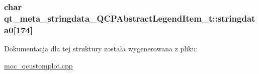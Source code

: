 \subsubsection[{\texorpdfstring{stringdata0}{stringdata0}}]{\setlength{\rightskip}{0pt plus 5cm}char qt\+\_\+meta\+\_\+stringdata\+\_\+\+Q\+C\+P\+Abstract\+Legend\+Item\+\_\+t\+::stringdata0\mbox{[}174\mbox{]}}\hypertarget{structqt__meta__stringdata___q_c_p_abstract_legend_item__t_a4987f6d279add0af922402e1f2e28b6b}{}\label{structqt__meta__stringdata___q_c_p_abstract_legend_item__t_a4987f6d279add0af922402e1f2e28b6b}


Dokumentacja dla tej struktury została wygenerowana z pliku\+:\begin{DoxyCompactItemize}
\item 
\hyperlink{moc__qcustomplot_8cpp}{moc\+\_\+qcustomplot.\+cpp}\end{DoxyCompactItemize}
